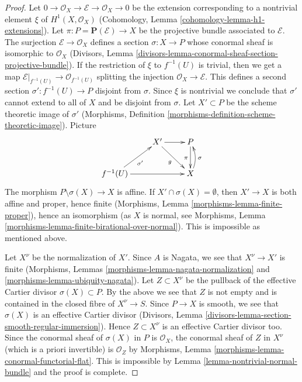 \documentclass[10pt,a4paper]{amsart}
\theoremstyle{plain}
\theoremstyle{definition}
\theoremstyle{remark}
\numberwithin{equation}{subsection}
\begin{document}
\begin{proof}
Let $0 \to \mathcal{O}_X \to \mathcal{E} \to \mathcal{O}_X \to 0$ be the
extension corresponding to a nontrivial element $\xi$ of
$H^1(X, \mathcal{O}_X)$
(Cohomology, Lemma \ref{cohomology-lemma-h1-extensions}).
Let $\pi : P = \mathbf{P}(\mathcal{E}) \to X$
be the projective bundle associated to $\mathcal{E}$.
The surjection $\mathcal{E} \to \mathcal{O}_X$
defines a section $\sigma : X \to P$ whose conormal sheaf is
isomorphic to $\mathcal{O}_X$ (Divisors, Lemma
\ref{divisors-lemma-conormal-sheaf-section-projective-bundle}).
If the restriction of $\xi$ to $f^{-1}(U)$ is trivial, then we get
a map $\mathcal{E}|_{f^{-1}(U)} \to \mathcal{O}_{f^{-1}(U)}$ splitting
the injection $\mathcal{O}_X \to \mathcal{E}$. This defines a second
section $\sigma' : f^{-1}(U) \to P$ disjoint from $\sigma$. Since $\xi$
is nontrivial we conclude that $\sigma'$ cannot extend to all of $X$
and be disjoint from $\sigma$. Let $X' \subset P$ be the
scheme theoretic image of $\sigma'$ (Morphisms,
Definition \ref{morphisms-definition-scheme-theoretic-image}).
Picture
$$
\xymatrix{
& X' \ar[rd]_g \ar[r] & P \ar[d]_\pi \\
f^{-1}(U) \ar[ru]_{\sigma'} \ar[rr] & & X \ar@/_/[u]_\sigma
}
$$
The morphism $P \setminus \sigma(X) \to X$ is affine.
If $X' \cap \sigma(X) = \emptyset$, then $X' \to X$ is both affine
and proper, hence finite
(Morphisms, Lemma \ref{morphisms-lemma-finite-proper}),
hence an isomorphism (as $X$ is normal, see
Morphisms, Lemma \ref{morphisms-lemma-finite-birational-over-normal}).
This is impossible as mentioned above.

\medskip\noindent
Let $X^\nu$ be the normalization of $X'$.
Since $A$ is Nagata, we see that $X^\nu \to X'$ is finite
(Morphisms, Lemmas \ref{morphisms-lemma-nagata-normalization} and
\ref{morphisms-lemma-ubiquity-nagata}). Let $Z \subset X^\nu$ be the
pullback of the effective Cartier divisor $\sigma(X) \subset P$.
By the above we see that $Z$ is not empty and is contained
in the closed fibre of $X^\nu \to S$.
Since $P \to X$ is smooth, we see that $\sigma(X)$ is an effective
Cartier divisor
(Divisors, Lemma \ref{divisors-lemma-section-smooth-regular-immersion}).
Hence $Z \subset X^\nu$ is an effective Cartier divisor too.
Since the conormal sheaf of $\sigma(X)$ in $P$ is $\mathcal{O}_X$, the
conormal sheaf of $Z$ in $X^\nu$ (which is a priori invertible)
is $\mathcal{O}_Z$ by
Morphisms, Lemma \ref{morphisms-lemma-conormal-functorial-flat}.
This is impossible by
Lemma \ref{lemma-nontrivial-normal-bundle}
and the proof is complete.
\end{proof}
\end{document}

